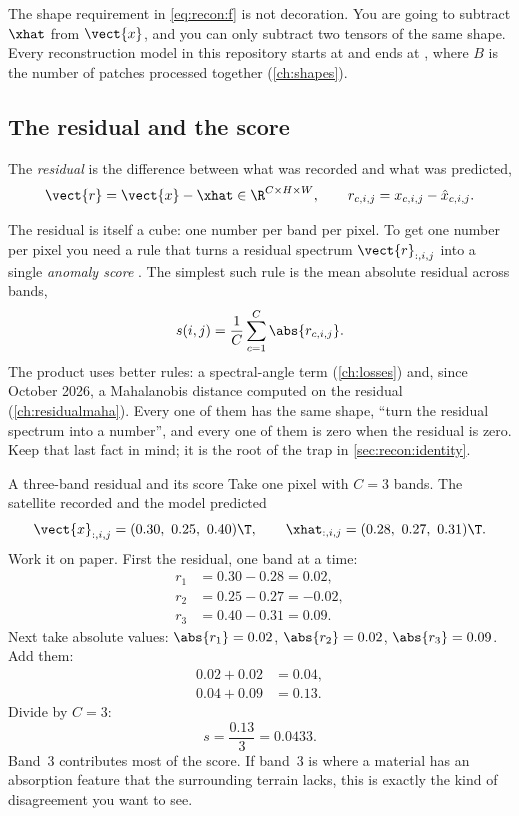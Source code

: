 The shape requirement in \cref{eq:recon:f} is not decoration. You are going to subtract $\xhat$ from
$\vect{x}$, and you can only subtract two tensors of the same shape. Every reconstruction model in
this repository starts at  and ends at , where $B$
is the number of patches processed together (\cref{ch:shapes}).

\subsection{The residual and the score}

\begin{definition}[Residual]\label{def:recon:residual}
The \emph{residual} is the difference between what was recorded and what was
predicted,
\begin{equation}\label{eq:recon:residual}
\vect{r} = \vect{x} - \xhat \in \R^{C\times H\times W},
\qquad r_{c,i,j} = x_{c,i,j} - \hat{x}_{c,i,j}.
\end{equation}
\end{definition}

The residual is itself a cube: one number per band per pixel. To get one number per pixel you need a
rule that turns a residual spectrum $\vect{r}_{:,i,j}$ into a single \emph{anomaly score}%
. The simplest such rule is the mean absolute residual across bands,
\begin{equation}\label{eq:recon:l1score}
s(i,j) = \frac{1}{C}\sum_{c=1}^{C} \abs{r_{c,i,j}}.
\end{equation}
The product uses better rules: a spectral-angle term (\cref{ch:losses}) and, since October 2026, a
Mahalanobis distance computed on the residual (\cref{ch:residualmaha}). Every one of them has the
same shape, ``turn the residual spectrum into a number'', and every one of them is zero when the
residual is zero. Keep that last fact in mind; it is the root of the trap in
\cref{sec:recon:identity}.

\begin{worked}[label={we:recon:score}]{A three-band residual and its score}
Take one pixel with $C=3$ bands. The satellite recorded and the model predicted
\[
\vect{x}_{:,i,j} = (0.30,\ 0.25,\ 0.40)\T,\qquad
\xhat_{:,i,j} = (0.28,\ 0.27,\ 0.31)\T .
\]
Work it on paper. First the residual, one band at a time:
\begin{align*}
r_1 &= 0.30 - 0.28 = 0.02,\\
r_2 &= 0.25 - 0.27 = -0.02,\\
r_3 &= 0.40 - 0.31 = 0.09.
\end{align*}
Next take absolute values: $\abs{r_1}=0.02$, $\abs{r_2}=0.02$, $\abs{r_3}=0.09$. Add them:
\begin{align*}
0.02 + 0.02 &= 0.04,\\
0.04 + 0.09 &= 0.13.
\end{align*}
Divide by $C=3$:
\[
s = \frac{0.13}{3} = 0.0433.
\]
Band~3 contributes most of the score. If band~3 is where a material has an absorption feature that
the surrounding terrain lacks, this is exactly the kind of disagreement you want to see.
\end{worked}

